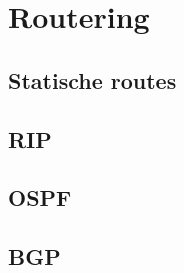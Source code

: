 \section{Routering}

\begin{frame}
\end{frame}

\subsection{Statische routes}

\begin{frame}
\end{frame}

\subsection{RIP}

\begin{frame}
\end{frame}

\subsection{OSPF}

\begin{frame}
\end{frame}

\subsection{BGP}

\begin{frame}
\end{frame}

